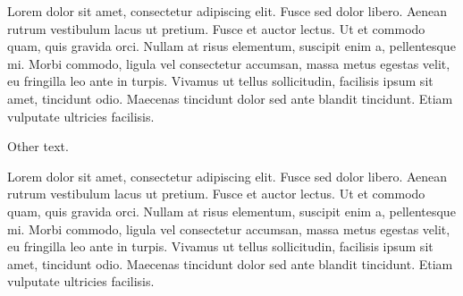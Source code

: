 \documentclass{article}
\begin{document}
\beginnumbering
\pstart
{} Lorem dolor sit amet, consectetur adipiscing elit. 
 Fusce sed dolor libero. Aenean rutrum vestibulum lacus ut pretium. Fusce et auctor lectus. Ut et commodo quam, quis gravida orci. Nullam at risus elementum, suscipit enim a, pellentesque mi. 
 Morbi commodo, ligula vel consectetur accumsan, massa metus egestas velit, eu fringilla leo ante in turpis. Vivamus ut tellus sollicitudin, facilisis ipsum sit amet, tincidunt odio. Maecenas tincidunt dolor sed ante blandit tincidunt. Etiam vulputate ultricies facilisis.
\pend
\endnumbering


Other text.
\makeatletter

\newpage
\beginnumbering
\pstart
{} Lorem dolor sit amet, consectetur adipiscing elit. 
 Fusce sed dolor libero. Aenean rutrum vestibulum lacus ut pretium. Fusce et auctor lectus. Ut et commodo quam, quis gravida orci. Nullam at risus elementum, suscipit enim a, pellentesque mi. 
 Morbi commodo, ligula vel consectetur accumsan, massa metus egestas velit, eu fringilla leo ante in turpis. Vivamus ut tellus sollicitudin, facilisis ipsum sit amet, tincidunt odio. Maecenas tincidunt dolor sed ante blandit tincidunt. Etiam vulputate ultricies facilisis.
\pend
\endnumbering
\makeatletter
\end{document}
